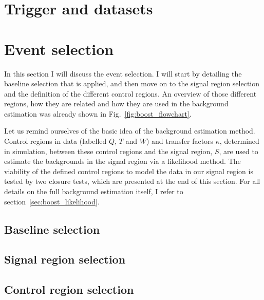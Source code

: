 


\section{Trigger and datasets \label{sec:trigger_datasets}}




\section{Event selection \label{sec:boost_event_selection}}

In this section I will discuss the event selection. I will start by detailing the baseline
selection that is applied, and then move on to the signal region selection and the definition of the
different control regions. 
An overview of those different regions, how they are related and how they are used in the
background estimation was already shown in Fig.~\ref{fig:boost_flowchart}. 

Let us remind ourselves of the basic idea of the background estimation method. Control regions in
data (labelled $Q$, $T$ and $W$) and transfer factors $\kappa$, determined in simulation,
between these control regions and the signal region, $S$, are used to estimate the backgrounds in
the signal region via a likelihood method. 
The viability of the defined control regions to model the data in our signal region is tested by
two closure tests, which are presented at the end of this section.
For all details on the full background estimation itself, I refer to
section~\ref{sec:boost_likelihood}. 


\subsection{Baseline selection \label{sec:boost_baseline_selection}}



\subsection{Signal region selection \label{sec:boost_signal_selection}}



\subsection{Control region selection \label{sec:boost_control_selection}}

